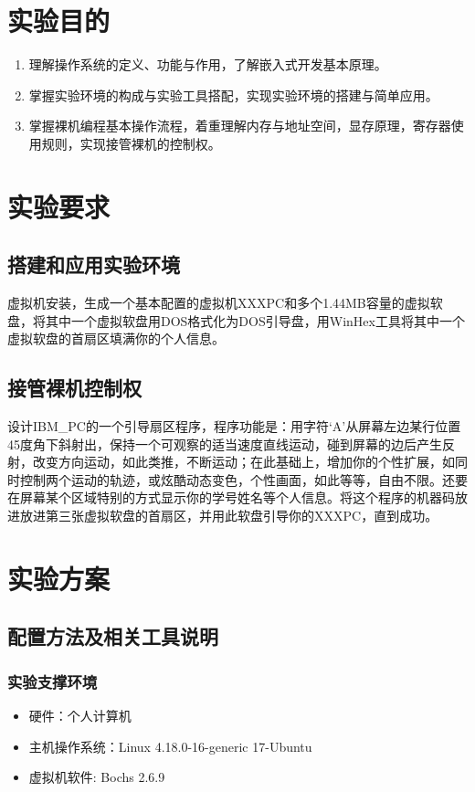 \documentclass[a4paper,11pt,UTF8]{ctexart}
\begin{document}
\section{实验目的}
	
	\begin{enumerate}
		\item 理解操作系统的定义、功能与作用，了解嵌入式开发基本原理。
		\item 掌握实验环境的构成与实验工具搭配，实现实验环境的搭建与简单应用。
		\item 掌握裸机编程基本操作流程，着重理解内存与地址空间，显存原理，寄存器使用规则，实现接管裸机的控制权。
	\end{enumerate}


\section{实验要求}

\subsection{搭建和应用实验环境}

	虚拟机安装，生成一个基本配置的虚拟机XXXPC和多个1.44MB容量的虚拟软盘，将其中一个虚拟软盘用DOS格式化为DOS引导盘，用WinHex工具将其中一个虚拟软盘的首扇区填满你的个人信息。
	

\subsection{接管裸机控制权}
	
    设计IBM\_PC的一个引导扇区程序，程序功能是：用字符‘A’从屏幕左边某行位置45度角下斜射出，保持一个可观察的适当速度直线运动，碰到屏幕的边后产生反射，改变方向运动，如此类推，不断运动；在此基础上，增加你的个性扩展，如同时控制两个运动的轨迹，或炫酷动态变色，个性画面，如此等等，自由不限。还要在屏幕某个区域特别的方式显示你的学号姓名等个人信息。将这个程序的机器码放进放进第三张虚拟软盘的首扇区，并用此软盘引导你的XXXPC，直到成功。
	

\section{实验方案}


\subsection{配置方法及相关工具说明}

\subsubsection{实验支撑环境}
	\begin{itemize} 
		\item 硬件：个人计算机
		\item 主机操作系统：Linux 4.18.0-16-generic 17-Ubuntu
		\item 虚拟机软件: Bochs 2.6.9
	\end{itemize}
	
\end{document}
